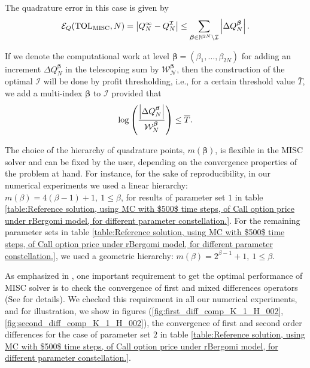 The quadrature error in this  case  is given by
\begin{equation}\label{eq:quadrature error}
	\mathcal{E}_Q(\text{TOL}_{\text{MISC}},N) =\left\lvert Q_N^\infty - Q_N^\mathcal{I}\right\rvert \le \sum_{\boldsymbol{\beta} \in \mathbb{N}^{2N} \setminus
		\mathcal{I}} \left\lvert\Delta Q_N^{\boldsymbol{\beta}}\right\rvert.
\end{equation}

If we denote the computational work at level $\boldsymbol{\beta} = (\beta_1, \ldots, \beta_{2N})$ for adding an increment $\Delta Q_N^{\boldsymbol{\beta}}$
in the telescoping sum by  $\mathcal{W_N^{\boldsymbol{\beta}}}$, then the  construction of the optimal  $\mathcal{I}$ will be done by profit thresholding, i.e.,
for a certain threshold value $\bar{T}$, we add a multi-index $\boldsymbol{\beta}$ to
$\mathcal{I}$ provided that
\begin{equation*}
	\log\left( \frac{\left\lvert\Delta Q_N^{\boldsymbol{\beta}}\right\rvert}{\mathcal{W}_N^{\boldsymbol{\beta}}} \right) \le \overline{T}.
\end{equation*}



\begin{remark}
	The choice of the hierarchy of quadrature points, $m(\boldsymbol{\beta})$, is flexible in the MISC solver and can be fixed by the user, depending on the convergence properties of the problem at hand. For instance, for the sake of reproducibility, in our numerical experiments we used a linear hierarchy: $m(\beta)=4 (\beta-1)+1,\: 1 \le \beta $, for results of parameter set $1$ in table \ref{table:Reference solution, using MC with $500$ time steps, of Call option price under rBergomi model, for different parameter constellation.}. For the remaining parameter sets in table  \ref{table:Reference solution, using MC with $500$ time steps, of Call option price under rBergomi model, for different parameter constellation.}, we used a geometric hierarchy: $m(\beta)=2^{\beta-1}+1, \:1 \le \beta $.
\end{remark} 


\begin{remark}
As emphasized in \cite{haji2016multi}, one important requirement to get the optimal performance of MISC solver is to check  the convergence of first and mixed differences operators (See \cite{haji2016multi} for details). We checked this requirement in all our numerical experiments, and for illustration, we show in figures (\ref{fig:first_diff_comp_K_1_H_002}, \ref{fig:second_diff_comp_K_1_H_002}), the convergence of first and second order differences for the case of parameter set $2$ in table \ref{table:Reference solution, using MC with $500$ time steps, of Call option price under rBergomi model, for different parameter constellation.}. 
\end{remark} 

